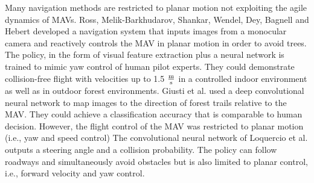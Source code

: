 Many navigation methods are restricted to planar motion not exploiting the agile dynamics of MAVs.
Ross, Melik-Barkhudarov, Shankar, Wendel, Dey, Bagnell and Hebert \cite{Ross2013}
developed a navigation system that inputs images from a monocular camera and
reactively controls the MAV in planar motion in order to avoid trees.
The policy, in the form of visual feature extraction plus a neural network is trained to mimic yaw control of human pilot experts.
They could demonstrate collision-free flight with velocities up to 1.5 $\frac{\text m}{\text s}$
in a controlled indoor environment as well as in outdoor forest environments.
Giusti et al. \cite{Giusti2016}  used a deep convolutional neural network to map images
to the direction of forest trails relative to the MAV.
They could achieve a classification accuracy that is comparable to human decision.
However, the flight control of the MAV was restricted to planar motion (i.e., yaw and speed control)
The convolutional neural network of Loquercio et al. \cite{Loquercio2018}
outputs a steering angle and a collision probability.
The policy can follow roadways and simultaneously avoid obstacles
but is also limited to planar control, i.e., forward velocity and yaw control.




%





